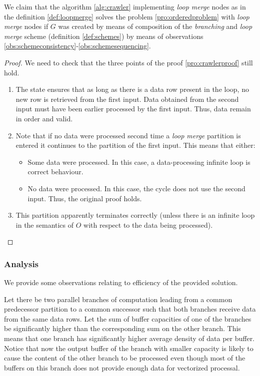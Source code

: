   We claim that the algorithm \ref{alg:crawler} implementing \emph{loop merge} nodes as in the definition \ref{def:loopmerge} solves the problem \ref{pro:orderedproblem} with \emph{loop merge} nodes if $G$ was created by means of composition of the \emph{branching} and \emph{loop merge} scheme (definition \ref{def:schemes}) by means of observations \ref{obs:schemeconsistency}-\ref{obs:schemesequencing}.
  \begin{proof}
    We need to check that the three points of the proof \ref{pro:crawlerproof} still hold.
    \begin{enumerate}
      \item The state ensures that as long as there is a data row present in the loop, no new row is retrieved from the first input. Data obtained from the second input must have been earlier processed by the first input. Thus, data remain in order and valid.
      \item Note that if no data were processed second time a \emph{loop merge} partition is entered it continues to the partition of the first input. This means that either:
       \begin{itemize}
         \item Some data were processed. In this case, a data-processing infinite loop is correct behaviour.
         \item No data were processed. In this case, the cycle does not use the second input. Thus, the original proof holds.
       \end{itemize}
     \item This partition apparently terminates correctly (unless there is an infinite loop in the semantics of $O$ with respect to the data being processed).
    \end{enumerate}
  \end{proof}
\myendclaim


\subsubsection{Analysis}
We provide some observations relating to efficiency of the provided solution.

\begin{observation}
  Let there be two parallel branches of computation leading from a common predecessor partition to a common successor such that both branches receive data from the same data rows. Let the sum of buffer capacities of one of the branches be significantly higher than the corresponding sum on the other branch. This means that one branch has significantly higher average density of data per buffer. Notice that now the output buffer of the branch with smaller capacity is likely to cause the content of the other branch to be processed even though most of the buffers on this branch does not provide enough data for vectorized processal.
\end{observation}

